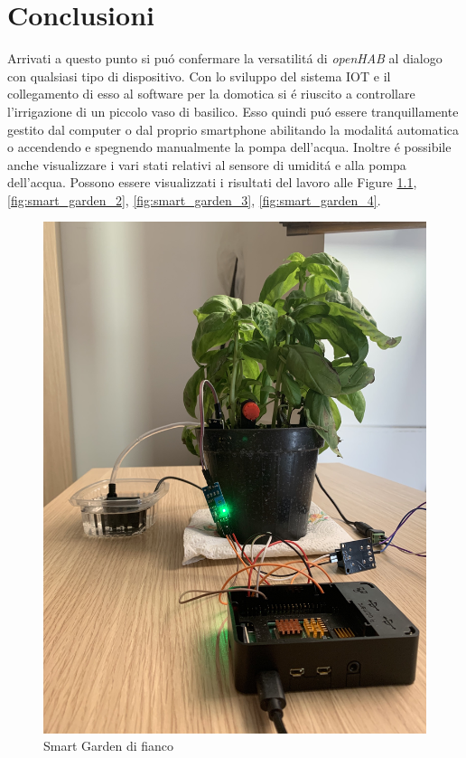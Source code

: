 \chapter{Conclusioni}
Arrivati a questo punto si pu\'o confermare la versatilit\'a di {\em openHAB} al dialogo con qualsiasi tipo di dispositivo. Con lo sviluppo del sistema IOT e il collegamento di esso al software per la domotica si \'e riuscito a controllare l'irrigazione di un piccolo vaso di basilico. Esso quindi pu\'o essere tranquillamente gestito dal computer o dal proprio smartphone abilitando la modalit\'a automatica o accendendo e spegnendo manualmente la pompa dell'acqua. Inoltre \'e possibile anche visualizzare i vari stati relativi al sensore di umidit\'a e alla pompa dell'acqua. Possono essere visualizzati i risultati del lavoro alle Figure \ref{fig:smart_garden_1}, \ref{fig:smart_garden_2}, \ref{fig:smart_garden_3}, \ref{fig:smart_garden_4}.

\begin{figure}
    \centering
    \includegraphics[width=12cm]{Immagini/smart_garden_1}
    \caption{Smart Garden di fianco}
    \label{fig:smart_garden_1}
\end{figure}

